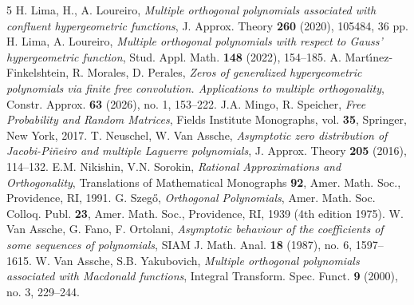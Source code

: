 \documentclass[12pt]{article}
\numberwithin{equation}{section}
\begin{document}
\begin{thebibliography}{5}
 H. Lima, H., A. Loureiro, 
\textit{Multiple orthogonal polynomials associated with confluent hypergeometric functions},
 J. Approx. Theory \textbf{260} (2020), 105484, 36 pp.
 H. Lima, A. Loureiro, 
\textit{Multiple orthogonal polynomials with respect to Gauss' hypergeometric function},
Stud. Appl. Math. \textbf{148} (2022), 154--185.
 A. Mart\'\i nez-Finkelshtein, R. Morales, D. Perales,
\textit{Zeros of generalized hypergeometric polynomials via finite free convolution. Applications to multiple orthogonality},
Constr. Approx. \textbf{63} (2026), no. 1, 153--222.
 J.A. Mingo, R. Speicher,
\textit{Free Probability and Random Matrices},
Fields Institute Monographs, vol. \textbf{35}, Springer, New York, 2017.
 T. Neuschel, W. Van Assche,
\textit{Asymptotic zero distribution of Jacobi-Pi\~neiro and multiple Laguerre polynomials},
J. Approx. Theory \textbf{205} (2016), 114--132.
 E.M. Nikishin, V.N. Sorokin,
\textit{Rational Approximations and Orthogonality},
Translations of Mathematical Monographs \textbf{92}, Amer. Math. Soc., Providence, RI, 1991.
 G. Szeg\H{o},
\textit{Orthogonal Polynomials},
Amer. Math. Soc. Colloq. Publ. \textbf{23}, Amer. Math. Soc., Providence, RI, 1939 (4th edition 1975).
 W. Van Assche, G. Fano, F. Ortolani,
\textit{Asymptotic behaviour of the coefficients of some sequences of polynomials},
SIAM J. Math. Anal. \textbf{18} (1987), no. 6, 1597--1615.
 W. Van Assche, S.B. Yakubovich, 
\textit{Multiple orthogonal polynomials associated with Macdonald functions},
Integral Transform. Spec. Funct. \textbf{9} (2000), no. 3, 229--244.
\end{thebibliography}
 
\end{document}
